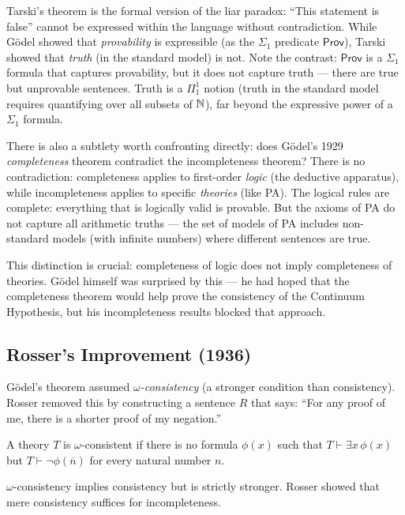 Tarski's theorem is the formal version of the liar paradox: ``This statement is false'' cannot be expressed within the language without contradiction. While Gödel showed that \emph{provability} is expressible (as the $\Sigma_1$ predicate $\mathsf{Prov}$), Tarski showed that \emph{truth} (in the standard model) is not. Note the contrast: $\mathsf{Prov}$ is a $\Sigma_1$ formula that captures provability, but it does not capture truth --- there are true but unprovable sentences. Truth is a $\Pi_1^1$ notion (truth in the standard model requires quantifying over all subsets of $\mathbb{N}$), far beyond the expressive power of a $\Sigma_1$ formula.

There is also a subtlety worth confronting directly: does Gödel's 1929 \emph{completeness} theorem contradict the incompleteness theorem? There is no contradiction: completeness applies to first-order \emph{logic} (the deductive apparatus), while incompleteness applies to specific \emph{theories} (like PA). The logical rules are complete: everything that is logically valid is provable. But the axioms of PA do not capture all arithmetic truths --- the set of models of PA includes non-standard models (with infinite numbers) where different sentences are true.

This distinction is crucial: completeness of logic does not imply completeness of theories. Gödel himself was surprised by this --- he had hoped that the completeness theorem would help prove the consistency of the Continuum Hypothesis, but his incompleteness results blocked that approach.

\subsection{Rosser's Improvement (1936)}
\label{sec:godel:rosser}

Gödel's theorem assumed \emph{$\omega$-consistency} (a stronger condition than consistency). Rosser removed this by constructing a sentence $R$ that says: ``For any proof of me, there is a shorter proof of my negation.''

\begin{definition}
A theory $T$ is $\omega$-consistent if there is no formula $\phi(x)$ such that $T \vdash \exists x\, \phi(x)$ but $T \vdash \neg \phi(\overline{n})$ for every natural number $n$.
\end{definition}

$\omega$-consistency implies consistency but is strictly stronger. Rosser showed that mere consistency suffices for incompleteness.

